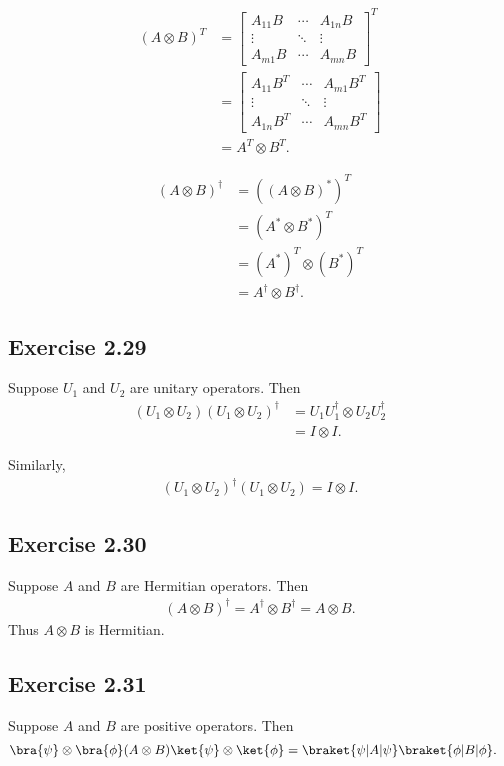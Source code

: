 \documentclass[a4paper,12pt]{article}
\begin{document}
\begin{align*}
	(A\otimes B)^T &=
	\begin{bmatrix}
		A_{11} B & \cdots & A_{1n} B \\
		\vdots & \ddots  & \vdots \\
		A_{m1}B & \cdots & A_{mn} B
	\end{bmatrix}^T \\
	&=
	\begin{bmatrix}
		A_{11} B^T & \cdots & A_{m1} B^T \\
		\vdots & \ddots  & \vdots \\
		A_{1n} B^T & \cdots & A_{mn} B^T
	\end{bmatrix} \\
	&= A^T \otimes B^T.
\end{align*}


\begin{align*}
	(A\otimes B)^\dagger&=((A \otimes B)^*)^T	\\
		&= (A^* \otimes B^*)^T\\
		&= (A^*)^T \otimes (B^*)^T\\
		&= A^\dagger \otimes B^\dagger.
\end{align*}

\subsection*{Exercise 2.29}
Suppose $U_1$ and $U_2$ are unitary operators. Then
\begin{align*}
	(U_1 \otimes U_2) (U_1 \otimes U_2)^\dagger &=U_1 U_1^\dagger \otimes U_2 U_2^\dagger\\
		&= I \otimes I.
\end{align*}

Similarly,
\begin{align*}
	(U_1 \otimes U_2)^\dagger (U_1 \otimes U_2)  = I \otimes I.
\end{align*}

\subsection*{Exercise 2.30}
Suppose $A$ and $B$ are Hermitian operators. Then
\begin{align}
(A \otimes B)^\dagger = A^\dagger \otimes B^\dagger = A \otimes B.
\end{align}
Thus $A \otimes B$ is Hermitian.



\subsection*{Exercise 2.31}
Suppose $A$ and $B$ are positive operators. Then
\begin{align*}
	\bra{\psi} \otimes \bra{\phi} (A \otimes B) \ket{\psi} \otimes \ket{\phi} &= \braket{\psi |A| \psi} \braket{\phi | B | \phi}.
\end{align*}
\end{document}

